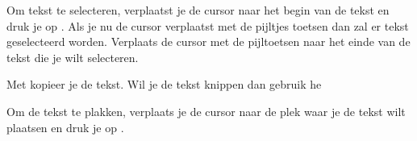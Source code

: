 Om tekst te selecteren, verplaatst je de cursor naar het begin van de tekst en druk je op . Als je nu de cursor verplaatst met de pijltjes toetsen dan zal er tekst geselecteerd worden. Verplaats de cursor met de pijltoetsen naar het einde van de tekst die je wilt selecteren.

Met  kopieer je de tekst. Wil je de tekst knippen dan gebruik he 

Om de tekst te plakken, verplaats je de cursor naar de plek waar je de tekst wilt plaatsen en druk je op .

